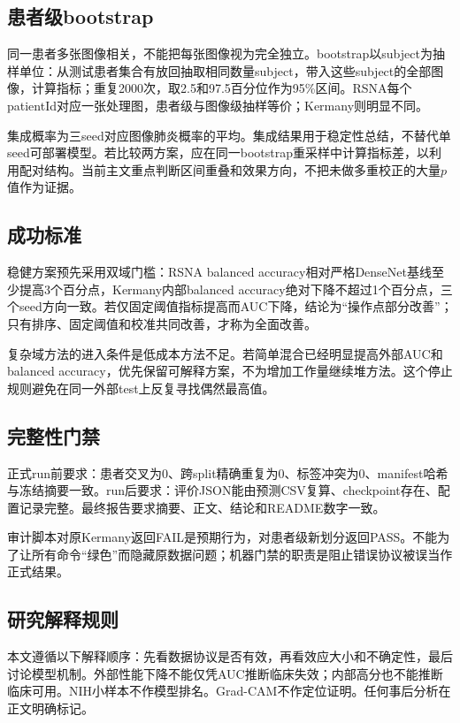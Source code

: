 \subsection{患者级bootstrap}

同一患者多张图像相关，不能把每张图像视为完全独立。bootstrap以subject为抽样单位：从测试患者集合有放回抽取相同数量subject，带入这些subject的全部图像，计算指标；重复2000次，取2.5和97.5百分位作为95\%区间。RSNA每个patientId对应一张处理图，患者级与图像级抽样等价；Kermany则明显不同。

集成概率为三seed对应图像肺炎概率的平均。集成结果用于稳定性总结，不替代单seed可部署模型。若比较两方案，应在同一bootstrap重采样中计算指标差，以利用配对结构。当前主文重点判断区间重叠和效果方向，不把未做多重校正的大量$p$值作为证据。

\subsection{成功标准}

稳健方案预先采用双域门槛：RSNA balanced accuracy相对严格DenseNet基线至少提高3个百分点，Kermany内部balanced accuracy绝对下降不超过1个百分点，三个seed方向一致。若仅固定阈值指标提高而AUC下降，结论为“操作点部分改善”；只有排序、固定阈值和校准共同改善，才称为全面改善。

复杂域方法的进入条件是低成本方法不足。若简单混合已经明显提高外部AUC和balanced accuracy，优先保留可解释方案，不为增加工作量继续堆方法。这个停止规则避免在同一外部test上反复寻找偶然最高值。

\subsection{完整性门禁}

正式run前要求：患者交叉为0、跨split精确重复为0、标签冲突为0、manifest哈希与冻结摘要一致。run后要求：评价JSON能由预测CSV复算、checkpoint存在、配置记录完整。最终报告要求摘要、正文、结论和README数字一致。

审计脚本对原Kermany返回FAIL是预期行为，对患者级新划分返回PASS。不能为了让所有命令“绿色”而隐藏原数据问题；机器门禁的职责是阻止错误协议被误当作正式结果。

\subsection{研究解释规则}

本文遵循以下解释顺序：先看数据协议是否有效，再看效应大小和不确定性，最后讨论模型机制。外部性能下降不能仅凭AUC推断临床失效；内部高分也不能推断临床可用。NIH小样本不作模型排名。Grad-CAM不作定位证明。任何事后分析在正文明确标记。

